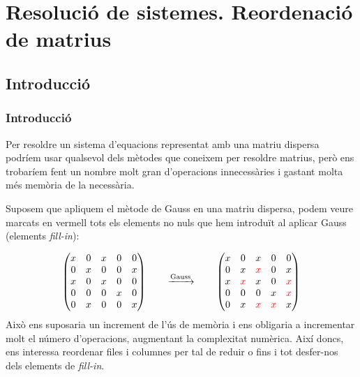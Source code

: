 \documentclass[8pt]{beamer}
\begin{document}
\begin{frame}
  
\end{frame}



\section[Resolució de sistemes]{Resolució de sistemes. Reordenació de matrius}
\subsection{Introducció}
\begin{frame}
  \frametitle{Introducció}
  Per resoldre un sistema d'equacions representat amb una matriu dispersa podríem usar qualsevol dels mètodes que coneixem per resoldre matrius, però ens trobaríem fent un nombre molt gran d'operacions innecessàries i gastant molta més memòria de la necessària. \newline

Suposem que apliquem el mètode de Gauss en una matriu dispersa, podem veure marcats en vermell tots els elements no nuls que hem introduït al aplicar Gauss (elements \textit{fill-in}):

\[
\begin{pmatrix}
  	x & 0 & x & 0 & 0\\
  	0 & x & 0 & 0 & x\\
  	x & 0 & x & 0 & 0\\
  	0 & 0 & 0 & x & 0\\
  	0 & x & 0 & 0 & x\\
\end{pmatrix} \qquad \xrightarrow{\text{Gauss}} \qquad
\begin{pmatrix}
  	x & 0 & x & 0 & 0\\
  	0 & x & \textcolor{red}{x} & 0 & x\\
  	x & \textcolor{red}{x} & x & 0 & \textcolor{red}{x}\\
  	0 & 0 & 0 & x & \textcolor{red}{x}\\
  	0 & x & \textcolor{red}{x} & \textcolor{red}{x} & x\\
\end{pmatrix}
\]
Això ens suposaria un increment de l'ús de memòria i ens obligaria a incrementar molt el número d'operacions, augmentant la complexitat numèrica. Així doncs, ens interessa reordenar files i columnes per tal de reduir o fins i tot desfer-nos dels elements de \textit{fill-in}. 
\end{frame}
\end{document}
